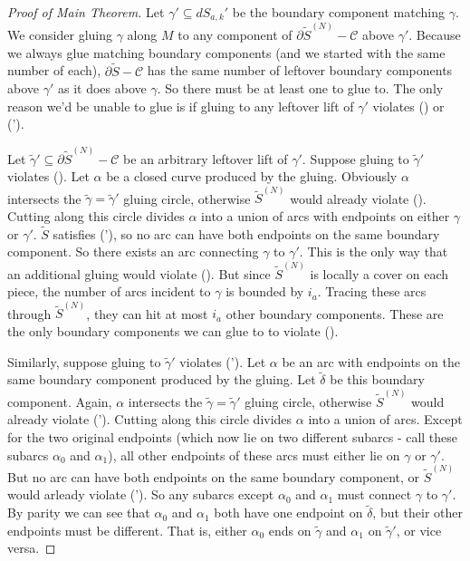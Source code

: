 \documentclass[12pt]{amsart}
\theoremstyle{definition}
\theoremstyle{remark}
\newcommand{\bd}{\partial}
\newcommand{\cin}{\subseteq}
\newcommand{\cC}{\mathcal{C}}
\begin{document}
\begin{proof}[Proof of Main Theorem]
Let $\gamma' \cin dS_{a,k}'$ be the boundary component matching $\gamma$. We
consider gluing $\gamma$ along $M$ to any component of $\bd\widetilde{S}^{(N)}
- \cC$ above $\gamma'$.  Because we always glue matching boundary components
(and we started with the same number of each), $\bd\widetilde{S} - \cC$ has the
same number of leftover boundary components above $\gamma'$ as it does above
$\gamma$. So there must be at least one to glue to.  The only reason we'd be
unable to glue is if gluing to any leftover lift of $\gamma'$ violates (\dag) or
(\dag').

Let $\widetilde{\gamma}' \cin \bd\widetilde{S}^{(N)} - \cC$ be an arbitrary
leftover lift of $\gamma'$.  Suppose gluing to $\widetilde{\gamma}'$ violates
(\dag). Let $\alpha$ be a closed curve produced by the gluing.  Obviously
$\alpha$ intersects the $\widetilde{\gamma} = \widetilde{\gamma}'$ gluing
circle, otherwise $\widetilde{S}^{(N)}$ would already violate (\dag).  Cutting
along this circle divides $\alpha$ into a union of arcs with endpoints on
either $\gamma$ or $\gamma'$.  $\widetilde{S}$ satisfies (\dag'), so no arc can
have both endpoints on the same boundary component. So there exists an arc
connecting $\gamma$ to $\gamma'$. This is the only way that an additional
gluing would violate (\dag). But since $\widetilde{S}^{(N)}$ is locally a cover
on each piece, the number of arcs incident to $\gamma$ is bounded by $i_a$.
Tracing these arcs through $\widetilde{S}^{(N)}$, they can hit at most $i_a$
other boundary components.  These are the only boundary components we can glue
to to violate (\dag).

Similarly, suppose gluing to $\widetilde{\gamma}'$ violates (\dag'). Let $\alpha$ be an
arc with endpoints on the same boundary component produced by the gluing. Let
$\widetilde{\delta}$ be this boundary component. Again, $\alpha$ intersects the
$\widetilde{\gamma} = \widetilde{\gamma}'$ gluing circle, otherwise $\widetilde{S}^{(N)}$ would already
violate (\dag').  Cutting along this circle divides $\alpha$ into a union of
arcs.  Except for the two original endpoints (which now lie on two different
subarcs - call these subarcs $\alpha_0$ and $\alpha_1$), all other endpoints of
these arcs must either lie on $\gamma$ or $\gamma'$.  But no arc can have both
endpoints on the same boundary component, or $\widetilde{S}^{(N)}$ would arleady violate
(\dag'). So any subarcs except $\alpha_0$ and $\alpha_1$ must connect $\gamma$ to
$\gamma'$.  By parity we can see that $\alpha_0$ and $\alpha_1$ both have one
endpoint on $\widetilde{\delta}$, but their other endpoints must be different. That is,
either $\alpha_0$ ends on $\widetilde{\gamma}$ and $\alpha_1$ on $\widetilde{\gamma}'$, or vice
versa.


\end{proof}
\end{document}
